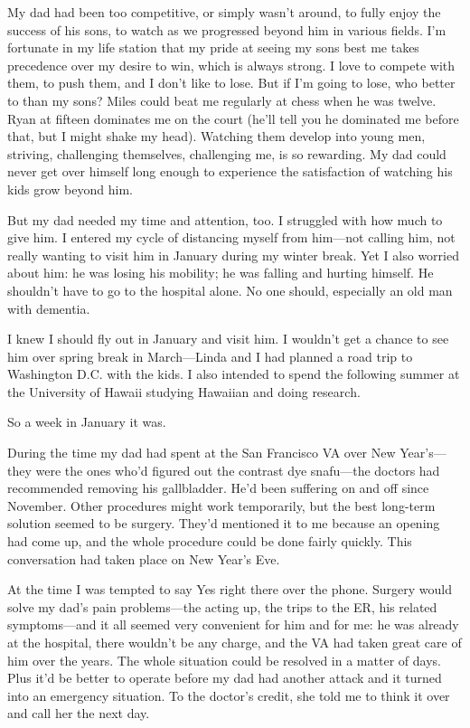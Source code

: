 \documentclass[12pt]{book}
\begin{document}
My dad had been too competitive, or simply wasn't around, to fully enjoy the success of his sons, to watch as we progressed beyond him in various fields. I'm fortunate in my life station that my pride at seeing my sons best me takes precedence over my desire to win, which is always strong. I love to compete with them, to push them, and I don't like to lose. But if I'm going to lose, who better to than my sons? Miles could beat me regularly at chess when he was twelve. Ryan at fifteen dominates me on the court (he'll tell you he dominated me before that, but I might shake my head). Watching them develop into young men, striving, challenging themselves, challenging me, is so rewarding. My dad could never get over himself long enough to experience the satisfaction of watching his kids grow beyond him.

But my dad needed my time and attention, too. I struggled with how much to give him. I entered my cycle of distancing myself from him---not calling him, not really wanting to visit him in January during my winter break. Yet I also worried about him: he was losing his mobility; he was falling and hurting himself. He shouldn't have to go to the hospital alone. No one should, especially an old man with dementia.

I knew I should fly out in January and visit him. I wouldn't get a chance to see him over spring break in March---Linda and I had planned a road trip to Washington D.C. with the kids. I also intended to spend the following summer at the University of Hawaii studying Hawaiian and doing research.

So a week in January it was.

During the time my dad had spent at the San Francisco VA over New Year's---they were the ones who'd figured out the contrast dye snafu---the doctors had recommended removing his gallbladder. He'd been suffering on and off since November. Other procedures might work temporarily, but the best long-term solution seemed to be surgery. They'd mentioned it to me because an opening had come up, and the whole procedure could be done fairly quickly. This conversation had taken place on New Year's Eve.

At the time I was tempted to say Yes right there over the phone. Surgery would solve my dad's pain problems---the acting up, the trips to the ER, his related symptoms---and it all seemed very convenient for him and for me: he was already at the hospital, there wouldn't be any charge, and the VA had taken great care of him over the years. The whole situation could be resolved in a matter of days. Plus it'd be better to operate before my dad had another attack and it turned into an emergency situation. To the doctor's credit, she told me to think it over and call her the next day.
\end{document}
